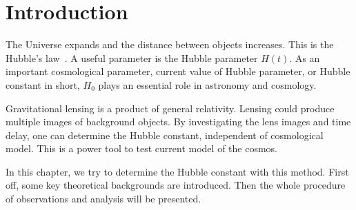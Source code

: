 \section{Introduction}
The Universe expands and the distance between objects increases. This is the Hubble's law~\cite{Rubakov}. A useful parameter is the Hubble parameter $H(t)$. As an important cosmological parameter, current value of Hubble parameter, or Hubble constant in short, $H_0$ plays an essential role in astronomy and cosmology.

Gravitational lensing is a product of general relativity. Lensing could produce multiple images of background objects. By investigating the lens images and time delay, one can determine the Hubble constant, independent of cosmological model. This is a power tool to test current model of the cosmos.

In this chapter, we try to determine the Hubble constant with this method. First off, some key theoretical backgrounds are introduced. Then the whole procedure of observations and analysis will be presented.
